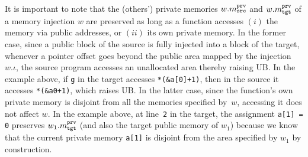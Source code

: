 It is important to note that the (others') private memories $w.m^{\texttt{prv}}_{\texttt{src}}$ and $w.m^{\texttt{prv}}_{\texttt{tgt}}$ of a
memory injection $w$ are preserved as long as a function accesses
$(i)$ the memory via public addresses, or $(ii)$ its own private memory.
In the former case,
since a public block of the source is fully injected into a block of the target,
whenever a pointer offset goes beyond the public area mapped by the injection $w.\iota$,
the source program accesses an unallocated area thereby raising UB.
In the example above, if \texttt{g} in the target accesses \texttt{*(\&a[0]+1)},
then in the source it accesses \texttt{*(\&a0+1)}, which raises UB.
In the latter case, since the function's own private memory
is disjoint from all the memories specified by~$w$,
accessing it does not affect $w$. In the example above, at line~\texttt{2} in the target, 
the assignment \texttt{a[1] = 0} preserves $w_1.m^{\texttt{prv}}_{\texttt{tgt}}$ (and also the target public memory of $w_1$) because we know that
the current private memory \texttt{a[1]} is disjoint from the area specified by $w_1$ by construction.




